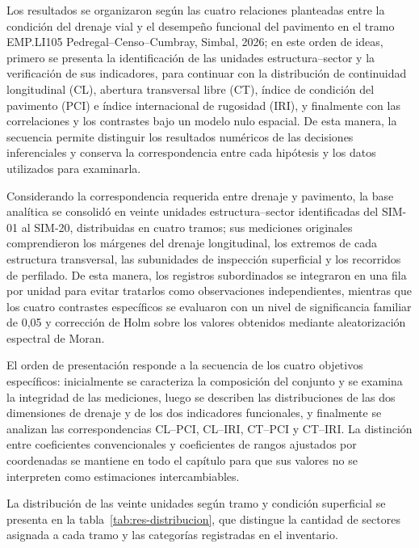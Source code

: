 \begingroup
\setlength{\emergencystretch}{2em}


Los resultados se organizaron según las cuatro relaciones planteadas entre la condición del drenaje vial y el desempeño funcional del pavimento en el tramo EMP.LI105 Pedregal–Censo–Cumbray, Simbal, 2026; en este orden de ideas, primero se presenta la identificación de las unidades estructura–sector y la verificación de sus indicadores, para continuar con la distribución de continuidad longitudinal (CL), abertura transversal libre (CT), índice de condición del pavimento (PCI) e índice internacional de rugosidad (IRI), y finalmente con las correlaciones y los contrastes bajo un modelo nulo espacial. De esta manera, la secuencia permite distinguir los resultados numéricos de las decisiones inferenciales y conserva la correspondencia entre cada hipótesis y los datos utilizados para examinarla.

Considerando la correspondencia requerida entre drenaje y pavimento, la base analítica se consolidó en veinte unidades estructura–sector identificadas del SIM-01 al SIM-20, distribuidas en cuatro tramos; sus mediciones originales comprendieron los márgenes del drenaje longitudinal, los extremos de cada estructura transversal, las subunidades de inspección superficial y los recorridos de perfilado. De esta manera, los registros subordinados se integraron en una fila por unidad para evitar tratarlos como observaciones independientes, mientras que los cuatro contrastes específicos se evaluaron con un nivel de significancia familiar de 0,05 y corrección de Holm sobre los valores obtenidos mediante aleatorización espectral de Moran.


El orden de presentación responde a la secuencia de los cuatro objetivos específicos: inicialmente se caracteriza la composición del conjunto y se examina la integridad de las mediciones, luego se describen las distribuciones de las dos dimensiones de drenaje y de los dos indicadores funcionales, y finalmente se analizan las correspondencias CL–PCI, CL–IRI, CT–PCI y CT–IRI. La distinción entre coeficientes convencionales y coeficientes de rangos ajustados por coordenadas se mantiene en todo el capítulo para que sus valores no se interpreten como estimaciones intercambiables.


La distribución de las veinte unidades según tramo y condición superficial se presenta en la tabla~\ref{tab:res-distribucion}, que distingue la cantidad de sectores asignada a cada tramo y las categorías registradas en el inventario.

